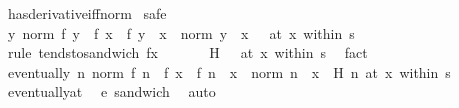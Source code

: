 \begin{isabellebody}
\endisadelimproof
%
\isatagproof
{}\isamarkupfalse%
\ has{\isacharunderscore}{\kern0pt}derivative{\isacharunderscore}{\kern0pt}iff{\isacharunderscore}{\kern0pt}norm\isanewline
{}\isamarkupfalse%
\ safe\isanewline
\ \ \isamarkupfalse%
\ {\isachardoublequoteopen}{\isacharparenleft}{\kern0pt}{\isacharparenleft}{\kern0pt}{\isasymlambda}y{\isachardot}{\kern0pt}\ norm\ {\isacharparenleft}{\kern0pt}f\ y\ {\isacharminus}{\kern0pt}\ f\ x\ {\isacharminus}{\kern0pt}\ f{\isacharprime}{\kern0pt}\ {\isacharparenleft}{\kern0pt}y\ {\isacharminus}{\kern0pt}\ x{\isacharparenright}{\kern0pt}{\isacharparenright}{\kern0pt}\ {\isacharslash}{\kern0pt}\ norm\ {\isacharparenleft}{\kern0pt}y\ {\isacharminus}{\kern0pt}\ x{\isacharparenright}{\kern0pt}{\isacharparenright}{\kern0pt}\ {\isasymlonglongrightarrow}\ {}{\isacharparenright}{\kern0pt}\ {\isacharparenleft}{\kern0pt}at\ x\ within\ s{\isacharparenright}{\kern0pt}{\isachardoublequoteclose}\isanewline
\ \ \isamarkupfalse%
\ {\isacharparenleft}{\kern0pt}rule\ tendsto{\isacharunderscore}{\kern0pt}sandwich{\isacharbrackleft}{\kern0pt}\ f{\isacharequal}{\kern0pt}{\isachardoublequoteopen}{\isasymlambda}x{\isachardot}{\kern0pt}\ {}{\isachardoublequoteclose}{\isacharbrackright}{\kern0pt}{\isacharparenright}{\kern0pt}\isanewline
\ \ \ \ \isamarkupfalse%
\ {\isachardoublequoteopen}{\isacharparenleft}{\kern0pt}H\ {\isasymlonglongrightarrow}\ {}{\isacharparenright}{\kern0pt}\ {\isacharparenleft}{\kern0pt}at\ x\ within\ s{\isacharparenright}{\kern0pt}{\isachardoublequoteclose}\ \isamarkupfalse%
\ fact\isanewline
\ \ \ \ \isamarkupfalse%
\ {\isachardoublequoteopen}eventually\ {\isacharparenleft}{\kern0pt}{\isasymlambda}n{\isachardot}{\kern0pt}\ norm\ {\isacharparenleft}{\kern0pt}f\ n\ {\isacharminus}{\kern0pt}\ f\ x\ {\isacharminus}{\kern0pt}\ f{\isacharprime}{\kern0pt}\ {\isacharparenleft}{\kern0pt}n\ {\isacharminus}{\kern0pt}\ x{\isacharparenright}{\kern0pt}{\isacharparenright}{\kern0pt}\ {\isacharslash}{\kern0pt}\ norm\ {\isacharparenleft}{\kern0pt}n\ {\isacharminus}{\kern0pt}\ x{\isacharparenright}{\kern0pt}\ {\isasymle}\ H\ n{\isacharparenright}{\kern0pt}\ {\isacharparenleft}{\kern0pt}at\ x\ within\ s{\isacharparenright}{\kern0pt}{\isachardoublequoteclose}\isanewline
\ \ \ \ \ \ \isamarkupfalse%
\ eventually{\isacharunderscore}{\kern0pt}at\ \isamarkupfalse%
\ e\ sandwich\ \isamarkupfalse%
\ auto\isanewline
\ \ \isamarkupfalse%

\end{isabellebody}
